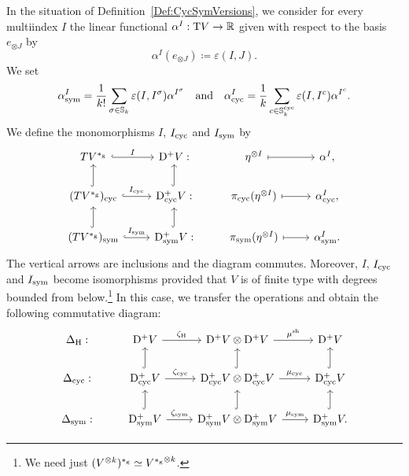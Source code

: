 \documentclass[\MainFolder/Text.tex]{subfiles}
\begin{document}
\begin{Proposition}\label{Prop:HochCycSym}
In the situation of Definition~\ref{Def:CycSymVersions}, we consider for every multiindex $I$ the linear functional $\alpha^I: \mathrm{T} V \rightarrow\mathbb{R}$ given with respect to the basis $e_{\otimes J}$ by 
$$\alpha^I(e_{\otimes J}) \coloneqq \varepsilon(I,J). $$
We set
\begin{equation*}
\alpha^I_{\mathrm{sym}} =  \frac{1}{k!} \sum_{\sigma\in \mathbb{S}_{k}}\varepsilon(I,I^\sigma) \alpha^{I^\sigma}\quad\text{and}\quad
\alpha^I_{\mathrm{cyc}} = \frac{1}{k}\sum_{c\in\mathbb{S}^{\mathrm{cyc}}_{k}}\varepsilon(I,I^c)\alpha^{I^c}.
\end{equation*}
We define the monomorphisms $I$, $I_{\mathrm{cyc}}$ and $I_{\mathrm{sym}}$ by
\begin{equation}\label{Eq:IdentDiaCycSym}
\begin{tikzcd}[ampersand replacement=\&]
 TV^{\GD} \arrow[hook]{r}{I} \& \DSpPlus V: \& \eta^{\otimes I} \arrow[mapsto]{r} \&  \alpha^I, \\
 (TV^{\GD})_{\CycMRM} \arrow[hook]{r}{I_{\CycMRM}}\arrow[hook]{u} \& \DSpPlusCyc V: \arrow[hook]{u} \& \CycProj(\eta^{\otimes I}) \arrow[mapsto]{r} \& \alpha_{\CycMRM}^I, \\
(TV^{\GD})_{\SymMRM} \arrow[hook]{r}{I_{\SymMRM}}\arrow[hook]{u} \& \DSpPlusSym V: \arrow[hook]{u} \& \SymProj(\eta^{\otimes I}) \arrow[mapsto]{r} \& \alpha_{\SymMRM}^I.
\end{tikzcd}
\end{equation}
The vertical arrows are inclusions and the diagram commutes. Moreover, $I$, $I_{\mathrm{cyc}}$ and $I_{\mathrm{sym}}$ become isomorphisms provided that $V$ is of finite type with degrees bounded from below.\footnote{We need just $(V^{\otimes k})^{*_{\mathrm{g}}} \simeq {V^{*_{\mathrm{g}}}}^{\otimes k}$.} In this case, we transfer the operations and obtain the following commutative diagram: 
\begin{equation}\label{Eq:ComDiagram}
\begin{tikzcd}
\BVOpHoch: &\DSpPlus V \arrow{r}{\CoProdHoch} & \DSpPlus V \otimes \DSpPlus V \arrow{r}{\ProdSh} & \DSpPlus V \\
\BVOpCyc: &\DSpPlusCyc V \arrow{r}{\CoProdCyc} \arrow[hook]{u} & \DSpPlusCyc V \otimes \DSpPlusCyc V \arrow{r}{\ProdCyc} \arrow[hook]{u} & \DSpPlusCyc V \arrow[hook]{u} \\
\BVOpSym: & \DSpPlusSym V \arrow{r}{\CoProdSym}\arrow[hook]{u} & \DSpPlusSym V \otimes \DSpPlusSym V \arrow{r}{\ProdSym} \arrow[hook]{u} & \DSpPlusSym V. \arrow[hook]{u}

\end{tikzcd}
\end{equation}
\end{Proposition}
\end{document}
